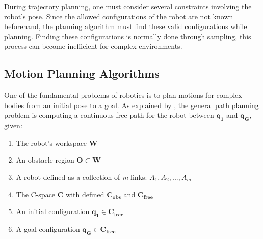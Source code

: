 During trajectory planning, one must consider several constraints involving the robot's pose. Since the allowed configurations of the robot are not known beforehand, the planning algorithm must find these valid configurations while planning. Finding these configurations is normally done through sampling, this process can become inefficient for complex environments.

%

\subsection{Motion Planning Algorithms}

One of the fundamental problems of robotics is to plan motions for complex bodies from an initial pose to a goal. As explained by \citet{Handbook}, the general path planning problem is computing a continuous free path for the robot between $\bm{q_{1}}$ and $\bm{q_{G}}$, given:
\begin{enumerate}
	\vspace{-5pt}
	\item The robot's workspace $\bm{W}$
	\vspace{-5pt}
	\item An obstacle region $\bm{O} \subset \bm{W}$
	\vspace{-5pt}
	\item A robot defined as a collection of \textit{m} links: $A_{1}, A_{2}, ... , A_{m}$
	\vspace{-5pt}
	\item The C-space $\bm{C}$ with defined $\bm{C_{obs}}$ and $\bm{C_{free}}$
	\vspace{-5pt} 
	\item An initial configuration $\bm{q_{1}} \in  \bm{C_{free}}$
	\vspace{-5pt} 
	\item A goal configuration $\bm{q_{G}} \in  \bm{C_{free}}$
\end{enumerate}

